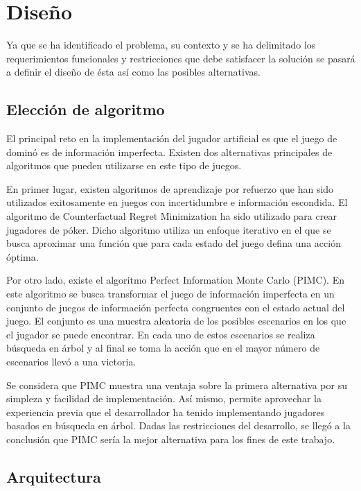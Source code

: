 \chapter{Diseño}

\noindent

Ya que se ha identificado el problema, su contexto y se ha delimitado los requerimientos 
funcionales y restricciones que debe satisfacer la solución se pasará a definir el diseño de 
ésta así como las posibles alternativas.

\section{Elección de algoritmo}

El principal reto en la implementación del jugador artificial es que el juego de dominó es de 
información imperfecta. Existen dos alternativas principales de algoritmos que pueden 
utilizarse en este tipo de juegos.

En primer lugar, existen algoritmos de aprendizaje por refuerzo que han sido utilizados 
exitosamente en juegos con incertidumbre e información escondida. El algoritmo de 
Counterfactual Regret Minimization ha sido utilizado para crear jugadores de póker. Dicho 
algoritmo utiliza un enfoque iterativo en el que se busca aproximar una función que para 
cada estado del juego defina una acción óptima.

Por otro lado, existe el algoritmo Perfect Information Monte Carlo (PIMC). En este 
algoritmo se busca transformar el juego de información imperfecta en un conjunto de 
juegos de información perfecta congruentes con el estado actual del juego. El conjunto es 
una muestra aleatoria de los posibles escenarios en los que el jugador se puede encontrar. 
En cada uno de estos escenarios se realiza búsqueda en árbol y al final se toma la acción 
que en el mayor número de escenarios llevó a una victoria.

Se considera que PIMC muestra una ventaja sobre la primera alternativa por su simpleza y 
facilidad de implementación. Así mismo, permite aprovechar la experiencia previa que el 
desarrollador ha tenido implementando jugadores basados en búsqueda en árbol. Dadas las 
restricciones del desarrollo, se llegó a la conclusión que PIMC sería la mejor alternativa 
para los fines de este trabajo.

\section{Arquitectura}

